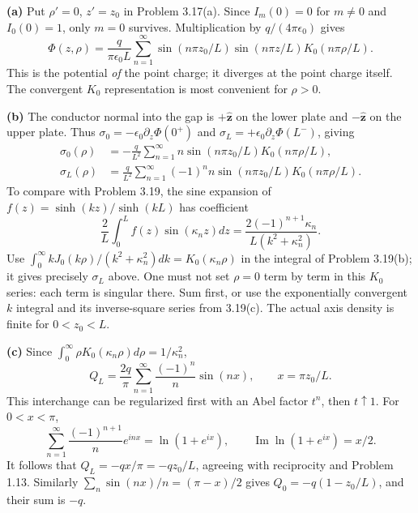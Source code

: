 \textbf{(a)} Put $\rho'=0$, $z'=z_0$ in Problem 3.17(a).
Since $I_m(0)=0$ for $m\ne0$ and $I_0(0)=1$, only $m=0$
survives.  Multiplication by $q/(4\pi\epsilon_0)$ gives
\[
\boxed{\Phi(z,\rho)=\frac q{\pi\epsilon_0L}
\sum_{n=1}^\infty\sin(n\pi z_0/L)\sin(n\pi z/L)
K_0(n\pi\rho/L).}
\]
This is the potential \emph{of} the point charge; it diverges at the
point charge itself.  The convergent $K_0$ representation is most
convenient for $\rho>0$.

\textbf{(b)} The conductor normal into the gap is $+\hat{\mathbf z}$
on the lower plate and $-\hat{\mathbf z}$ on the upper plate.
Thus $\sigma_0=-\epsilon_0\partial_z\Phi(0^+)$ and
$\sigma_L=+\epsilon_0\partial_z\Phi(L^-)$, giving
\begin{align*}
\sigma_0(\rho)&=-\frac q{L^2}\sum_{n=1}^\infty
n\sin(n\pi z_0/L)K_0(n\pi\rho/L),\\
\sigma_L(\rho)&=\frac q{L^2}\sum_{n=1}^\infty
(-1)^nn\sin(n\pi z_0/L)K_0(n\pi\rho/L).
\end{align*}
To compare with Problem 3.19, the sine expansion of
$f(z)=\sinh(kz)/\sinh(kL)$ has coefficient
\[
\frac2L\int_0^Lf(z)\sin(\kappa_nz)dz
=\frac{2(-1)^{n+1}\kappa_n}{L(k^2+\kappa_n^2)}.
\]
Use
$\int_0^\infty kJ_0(k\rho)/(k^2+\kappa_n^2)dk=K_0(\kappa_n\rho)$
in the integral of Problem 3.19(b); it gives precisely $\sigma_L$
above.  One must not set $\rho=0$ term by term in this $K_0$ series:
each term is singular there.  Sum first, or use the exponentially
convergent $k$ integral and its inverse-square series from 3.19(c).
The actual axis density is finite for $0<z_0<L$.

\textbf{(c)} Since
$\int_0^\infty\rho K_0(\kappa_n\rho)d\rho=1/\kappa_n^2$,
\[
Q_L=\frac{2q}{\pi}\sum_{n=1}^\infty
\frac{(-1)^n}{n}\sin(nx),\qquad x=\pi z_0/L.
\]
This interchange can be regularized first with an Abel factor
$t^n$, then $t\uparrow1$.  For $0<x<\pi$,
\[
\sum_{n=1}^\infty\frac{(-1)^{n+1}}n e^{inx}
=\ln(1+e^{ix}),\qquad
\operatorname{Im}\ln(1+e^{ix})=x/2.
\]
It follows that $Q_L=-qx/\pi=-qz_0/L$, agreeing with reciprocity
and Problem 1.13.  Similarly
$\sum_n\sin(nx)/n=(\pi-x)/2$ gives
$Q_0=-q(1-z_0/L)$, and their sum is $-q$.

